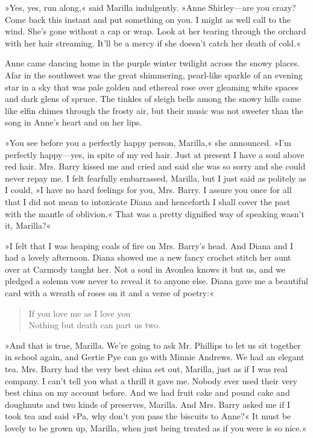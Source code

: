 »Yes, yes, run along,« said Marilla indulgently. »Anne Shirley—are you crazy? Come back this instant and put something on you. I might as well call to the wind. She's gone without a cap or wrap. Look at her tearing through the orchard with her hair streaming. It'll be a mercy if she doesn't catch her death of cold.«

Anne came dancing home in the purple winter twilight across the snowy places. Afar in the southwest was the great shimmering, pearl-like sparkle of an evening star in a sky that was pale golden and ethereal rose over gleaming white spaces and dark glens of spruce. The tinkles of sleigh bells among the snowy hills came like elfin chimes through the frosty air, but their music was not sweeter than the song in Anne's heart and on her lips.

»You see before you a perfectly happy person, Marilla,« she announced. »I'm perfectly happy—yes, in spite of my red hair. Just at present I have a soul above red hair. Mrs. Barry kissed me and cried and said she was so sorry and she could never repay me. I felt fearfully embarrassed, Marilla, but I just said as politely as I could, »I have no hard feelings for you, Mrs. Barry. I assure you once for all that I did not mean to intoxicate Diana and henceforth I shall cover the past with the mantle of oblivion.« That was a pretty dignified way of speaking wasn't it, Marilla?«

»I felt that I was heaping coals of fire on Mrs. Barry's head. And Diana and I had a lovely afternoon. Diana showed me a new fancy crochet stitch her aunt over at Carmody taught her. Not a soul in Avonlea knows it but us, and we pledged a solemn vow never to reveal it to anyone else. Diana gave me a beautiful card with a wreath of roses on it and a verse of poetry:«

\begin{verse}
If you love me as I love you\\
Nothing but death can part us two.
\end{verse}

»And that is true, Marilla. We're going to ask Mr. Phillips to let us sit together in school again, and Gertie Pye can go with Minnie Andrews. We had an elegant tea. Mrs. Barry had the very best china set out, Marilla, just as if I was real company. I can't tell you what a thrill it gave me. Nobody ever used their very best china on my account before. And we had fruit cake and pound cake and doughnuts and two kinds of preserves, Marilla. And Mrs. Barry asked me if I took tea and said »Pa, why don't you pass the biscuits to Anne?« It must be lovely to be grown up, Marilla, when just being treated as if you were is so nice.«

